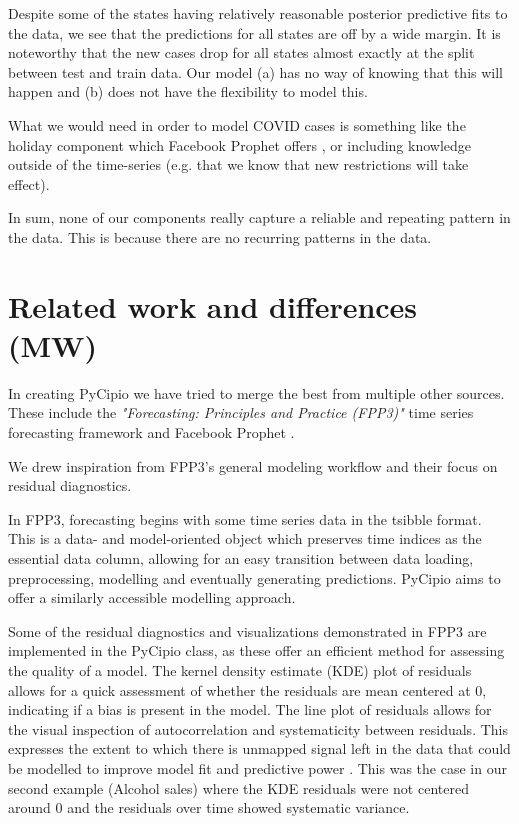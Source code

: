 \documentclass{article}
\begin{document}
\noindent Despite some of the states having relatively reasonable posterior predictive fits to the data, we see that the predictions for all states are off by a wide margin. It is noteworthy that the new cases drop for all states almost exactly at the split between test and train data. Our model (a) has no way of knowing that this will happen and (b) does not have the flexibility to model this. 

\noindent What we would need in order to model COVID cases is something like the holiday component which Facebook Prophet offers \cite{taylor2018forecasting}, or including knowledge outside of the time-series (e.g. that we know that new restrictions will take effect). 

\noindent In sum, none of our components really capture a reliable and repeating pattern in the data. This is because there are no recurring patterns in the data. 


\section{Related work and differences (MW)}

\noindent In creating PyCipio we have tried to merge the best from multiple other sources. These include the \textit{"Forecasting: Principles and Practice (FPP3)"} time series forecasting framework \cite{fpp3} and Facebook Prophet \cite{taylor2018forecasting}.

\noindent We drew inspiration from FPP3’s general modeling workflow and their focus on residual diagnostics. 

\noindent In FPP3, forecasting begins with some time series data in the tsibble format. This is a data- and model-oriented object which preserves time indices as the essential data column, allowing for an easy transition between data loading, preprocessing, modelling and eventually generating predictions. PyCipio aims to offer a similarly accessible modelling approach. 

\noindent Some of the residual diagnostics and visualizations demonstrated in FPP3 are implemented in the PyCipio class, as these offer an efficient method for assessing the quality of a model.
The kernel density estimate (KDE) plot of residuals allows for a quick assessment of whether the residuals are mean centered at 0, indicating if a bias is present in the model. The line plot of residuals allows for the visual inspection of autocorrelation and systematicity between residuals. This expresses the extent to which there is unmapped signal left in the data that could be modelled to improve model fit and predictive power \cite{fpp3}. This was the case in our second example (Alcohol sales) where the KDE residuals were not centered around 0 and the residuals over time showed systematic variance. 
\end{document}
